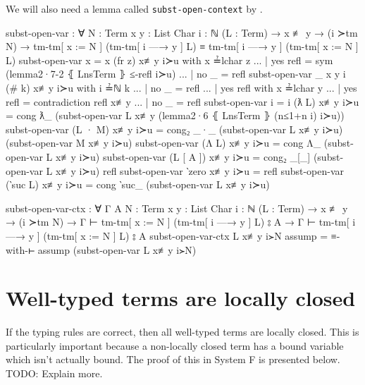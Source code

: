 \documentclass[logo,bsc,singlespacing,parskip,online]{infthesis}
\renewenvironment{code}{\mintedcopy[breaklines,breaksymbolleft=\;]{agda}}{\endmintedcopy}
\begin{document}
We will also need a lemma called \texttt{subst-open-context} by \citet{chargueraud_locally_2012}.

\begin{code}
  subst-open-var : ∀ {N : Term} {x y : List Char} {i : ℕ}
    (L : Term)
    → x ≢ y
    → (i ≻tm N)
    → tm-tm[ x := N ] (tm-tm[ i —→ y ] L)
      ≡ tm-tm[ i —→ y ] (tm-tm[ x := N ] L)
  subst-open-var {x = x} (fr z) x≢y i≻u with x ≟lchar z
  ... | yes refl = sym (lemma2·7-2 ⦃ LnsTerm ⦄  ≤-refl i≻u)
  ... | no  _    = refl
  subst-open-var {_} {x} {y} {i} (# k) x≢y i≻u with i ≟ℕ k
  ... | no  _ = refl
  ... | yes refl with x ≟lchar y
  ...    | yes refl = contradiction refl x≢y
  ...    | no  _    = refl
  subst-open-var {i = i} (ƛ L) x≢y i≻u = cong ƛ_
    (subst-open-var L x≢y (lemma2·6 ⦃ LnsTerm ⦄ (n≤1+n i) i≻u))
  subst-open-var (L · M) x≢y i≻u = cong₂ _·_
    (subst-open-var L x≢y i≻u) (subst-open-var M x≢y i≻u)
  subst-open-var (Λ L) x≢y i≻u =
    cong Λ_ (subst-open-var L x≢y i≻u)
  subst-open-var (L [ A ]) x≢y i≻u =
    cong₂ _[_] (subst-open-var L x≢y i≻u) refl
  subst-open-var ‵zero x≢y i≻u = refl
  subst-open-var (‵suc L) x≢y i≻u =
    cong ‵suc_ (subst-open-var L x≢y i≻u)

  subst-open-var-ctx : ∀ {Γ A} {N : Term} {x y : List Char} {i : ℕ}
    (L : Term)
    → x ≢ y
    → (i ≻tm N)
    → Γ ⊢ tm-tm[ x := N ] (tm-tm[ i —→ y ] L) ⦂ A
    → Γ ⊢ tm-tm[ i —→ y ] (tm-tm[ x := N ] L) ⦂ A
  subst-open-var-ctx L x≢y i≻N assump =
    ≡-with-⊢ assump (subst-open-var L x≢y i≻N)
\end{code}

\section{Well-typed terms are locally closed}
If the typing rules are correct, then all well-typed terms are locally closed. This is particularly
important because a non-locally closed term has a bound variable which isn't actually bound. The
proof of this in System F is presented below. TODO: Explain more.
\end{document}
